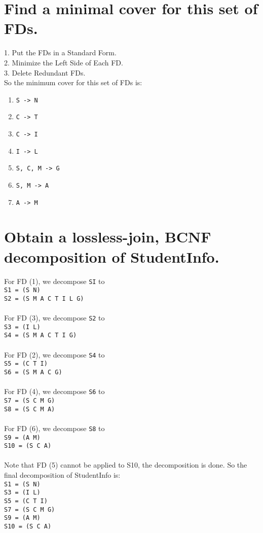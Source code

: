 \documentclass{article}
\begin{document}
\section{Find a minimal cover for this set of FDs.}

1. Put the FDs in a Standard Form.\\
2. Minimize the Left Side of Each FD.\\
3. Delete Redundant FDs.\\
So the minimum cover for this set of FDs is:
	\begin{enumerate}
		\item \texttt{S -> N}
		\item \texttt{C -> T}
		\item \texttt{C -> I}
		\item \texttt{I -> L}
		\item \texttt{S, C, M -> G}
		\item \texttt{S, M -> A}
		\item \texttt{A -> M}
	\end{enumerate}

\section{Obtain a lossless-join, BCNF decomposition of StudentInfo.}

For FD (1), we decompose \texttt{SI} to\\
\texttt{S1 = (S N)} \\
\texttt{S2 = (S M A C T I L G)} \\
\\
For FD (3), we decompose \texttt{S2} to\\
\texttt{S3 = (I L)} \\
\texttt{S4 = (S M A C T I G)} \\
\\
For FD (2), we decompose \texttt{S4} to \\
\texttt{S5 = (C T I)} \\
\texttt{S6 = (S M A C G)} \\
\\
For FD (4), we decompose \texttt{S6} to \\
\texttt{S7 = (S C M G)} \\
\texttt{S8 = (S C M A)} \\
\\
For FD (6), we decompose \texttt{S8} to \\
\texttt{S9 = (A M)} \\
\texttt{S10 = (S C A)}\\
\\
Note that FD (5) cannot be applied to S10, the decomposition is done. So the final decomposition of StudentInfo is:\\
\texttt{S1 = (S N)} \\
\texttt{S3 = (I L)} \\
\texttt{S5 = (C T I)} \\
\texttt{S7 = (S C M G)} \\
\texttt{S9 = (A M)} \\
\texttt{S10 = (S C A)}\\
\end{document}
